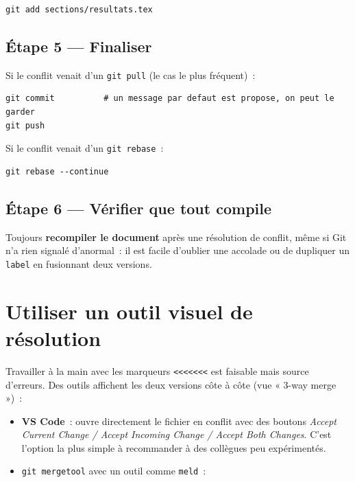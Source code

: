 \documentclass[11pt,a4paper]{article}
\begin{document}
\begin{lstlisting}[style=bashstyle]
git add sections/resultats.tex
\end{lstlisting}

\subsection*{Étape 5 --- Finaliser}

Si le conflit venait d'un \texttt{git pull} (le cas le plus fréquent)~:

\begin{lstlisting}[style=bashstyle]
git commit          # un message par defaut est propose, on peut le garder
git push
\end{lstlisting}

Si le conflit venait d'un \texttt{git rebase}~:

\begin{lstlisting}[style=bashstyle]
git rebase --continue
\end{lstlisting}

\subsection*{Étape 6 --- Vérifier que tout compile}

Toujours \textbf{recompiler le document} après une résolution de conflit, même si Git n'a rien signalé d'anormal~: il est facile d'oublier une accolade ou de dupliquer un \texttt{label} en fusionnant deux versions.

\section{Utiliser un outil visuel de résolution}

Travailler à la main avec les marqueurs \texttt{<<<<<<<} est faisable mais source d'erreurs. Des outils affichent les deux versions côte à côte (vue « 3-way merge »)~:

\begin{itemize}
  \item \textbf{VS Code}~: ouvre directement le fichier en conflit avec des boutons \emph{Accept Current Change / Accept Incoming Change / Accept Both Changes}. C'est l'option la plus simple à recommander à des collègues peu expérimentés.
  \item \texttt{git mergetool} avec un outil comme \texttt{meld}~:
\end{itemize}
\end{document}
